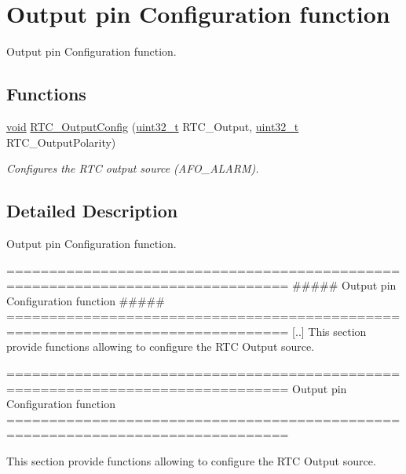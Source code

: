 \hypertarget{group___r_t_c___group6}{\section{Output pin Configuration function}
\label{group___r_t_c___group6}
}


Output pin Configuration function.  


\subsection*{Functions}
\begin{DoxyCompactItemize}
\item 
\hyperlink{group___n_a_m_e_ga18028b8badbf1ea7e704ccac3c488e82}{void} \hyperlink{group___r_t_c___group6_gae3165ef19ef3bd63789e59130ad8d89b}{R\-T\-C\-\_\-\-Output\-Config} (\hyperlink{stdint_8h_a435d1572bf3f880d55459d9805097f62}{uint32\-\_\-t} R\-T\-C\-\_\-\-Output, \hyperlink{stdint_8h_a435d1572bf3f880d55459d9805097f62}{uint32\-\_\-t} R\-T\-C\-\_\-\-Output\-Polarity)
\begin{DoxyCompactList}\small\item\em Configures the R\-T\-C output source (A\-F\-O\-\_\-\-A\-L\-A\-R\-M). \end{DoxyCompactList}\end{DoxyCompactItemize}


\subsection{Detailed Description}
Output pin Configuration function. \begin{DoxyVerb} ===============================================================================
                   ##### Output pin Configuration function #####
 ===============================================================================
    [..] This section provide functions allowing to configure the RTC Output source.\end{DoxyVerb}


\begin{DoxyVerb} ===============================================================================
                         Output pin Configuration function
 ===============================================================================  

  This section provide functions allowing to configure the RTC Output source.\end{DoxyVerb}
 

